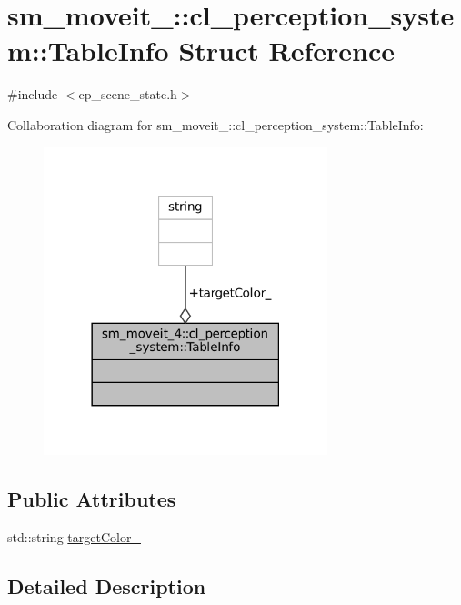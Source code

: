 \hypertarget{structsm__moveit__4_1_1cl__perception__system_1_1TableInfo}{}\section{sm\+\_\+moveit\+\_\+:\+:cl\+\_\+perception\+\_\+system\+:\+:Table\+Info Struct Reference}
\label{structsm__moveit__4_1_1cl__perception__system_1_1TableInfo}


{\ttfamily \#include $<$cp\+\_\+scene\+\_\+state.\+h$>$}



Collaboration diagram for sm\+\_\+moveit\+\_\+:\+:cl\+\_\+perception\+\_\+system\+:\+:Table\+Info\+:
\nopagebreak
\begin{figure}[H]
\begin{center}
\leavevmode
\includegraphics[width=234pt]{structsm__moveit__4_1_1cl__perception__system_1_1TableInfo__coll__graph}
\end{center}
\end{figure}
\subsection*{Public Attributes}
\begin{DoxyCompactItemize}
\item 
std\+::string \hyperlink{structsm__moveit__4_1_1cl__perception__system_1_1TableInfo_ad4361daafb35048ab3d507850f02eeba}{target\+Color\+\_\+}
\end{DoxyCompactItemize}


\subsection{Detailed Description}


